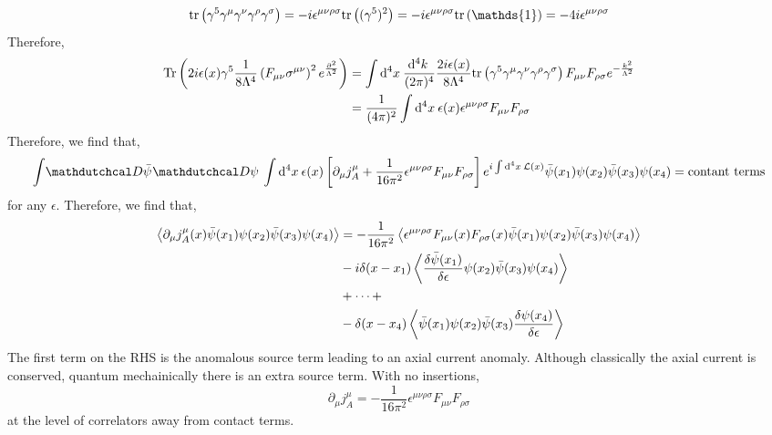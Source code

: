 \documentclass[12pt]{extarticle}
\begin{document}
\[ \tr{\gamma^5 \gamma^\mu \gamma^\nu \gamma^\rho \gamma^\sigma} = - i \epsilon^{\mu \nu \rho \sigma} \tr{(\gamma^5)^2} = - i \epsilon^{\mu \nu \rho \sigma} \tr{\mathds{1}} = - 4 i \epsilon^{\mu \nu \rho \sigma} \]
Therefore, 
\begin{align*}
\mathrm{Tr}\left( 2 i \epsilon(x) \gamma^5 \frac{1}{8 \Lambda^4} \left( F_{\mu \nu} \sigma^{\mu \nu} \right)^2 e^{\frac{\partial^2}{\Lambda^2}} \right) & = \int \mathrm{d}^{4} x \: \frac{\mathrm{d}^{4} k \:}{(2\pi)^4} \frac{2 i \epsilon(x)}{8 \Lambda^4} \mathrm{tr} \left( \gamma^5 \gamma^\mu \gamma^\nu \gamma^\rho \gamma^\sigma \right) F_{\mu\nu} F_{\rho \sigma} e^{- \frac{k^2}{\Lambda^2}} 
\\
& = \frac{1}{(4 \pi)^2} \int \mathrm{d}^{4} x \: \epsilon(x) \epsilon^{\mu \nu \rho \sigma} F_{\mu\nu} F_{\rho \sigma}
\end{align*}
Therefore, we find that,
\begin{align*}
\int \pathd{\bar{\psi}} \pathd{\psi} \int \dn{4}{x} \epsilon(x) \left[ \partial_\mu j_A^\mu + \frac{1}{16 \pi^2} \epsilon^{\mu \nu \rho \sigma} F_{\mu \nu} F_{\rho \sigma} \right] e^{i \int \dn{4}{x} \lagrange(x)} \bar{\psi}(x_1) \psi(x_2) \bar{\psi}(x_3) \psi(x_4) = \text{contant terms}
\end{align*}
for any $\epsilon$. Therefore, we find that,
\begin{align*}
\left< \partial_\mu j_A^\mu(x) \bar{\psi}(x_1) \psi(x_2) \bar{\psi}(x_3) \psi(x_4) \right> & = - \frac{1}{16 \pi^2} \left< \epsilon^{\mu \nu \rho \sigma} F_{\mu \nu}(x) F_{\rho \sigma}(x) \bar{\psi}(x_1) \psi(x_2) \bar{\psi}(x_3) \psi(x_4)  \right>
\\
& - i \delta(x - x_1) \left<  \frac{\delta \bar{\psi}(x_1)}{\delta \epsilon} \psi(x_2) \bar{\psi}(x_3) \psi(x_4)  \right> 
\\
& + \cdots +
\\
& -\delta(x - x_4) \left<  \bar{\psi}(x_1) \psi(x_2) \bar{\psi}(x_3) \frac{ \delta \psi(x_4)}{\delta \epsilon} \right>
\end{align*}
The first term on the RHS is the anomalous source term leading to an axial current anomaly. Although classically the axial current is conserved, quantum mechainically there is an extra source term. With no insertions,
\[ \partial_\mu j_A^\mu = - \frac{1}{16 \pi^2} \epsilon^{\mu \nu \rho \sigma} F_{\mu \nu} F_{\rho \sigma} \]
at the level of correlators away from contact terms. 
\end{document}
